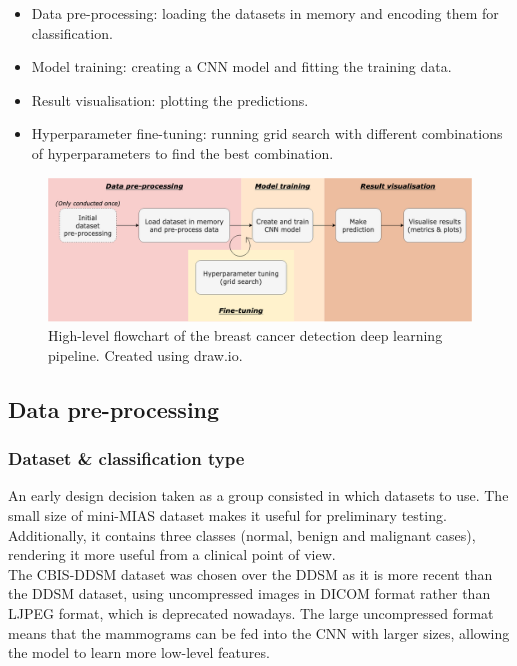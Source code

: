 \begin{itemize}
    \item Data pre-processing: loading the datasets in memory and encoding them for classification.
    \item Model training: creating a CNN model and fitting the training data.
    \item Result visualisation: plotting the predictions.
    \item Hyperparameter fine-tuning: running grid search with different combinations of hyperparameters to find the best combination.
\end{itemize}

\begin{figure}[ht]
\centerline{\includegraphics[width=1.1\textwidth]{Dissertation/figures/design/design flowchart.png}}
\caption{\label{fig:design-flowchart}High-level flowchart of the breast cancer detection deep learning pipeline. Created using draw.io.}
\end{figure}


\subsection{Data pre-processing}

\subsubsection{Dataset \& classification type}

An early design decision taken as a group consisted in which datasets to use. The small size of mini-MIAS dataset makes it useful for preliminary testing. Additionally, it contains three classes (normal, benign and malignant cases), rendering it more useful from a clinical point of view.\\  

The CBIS-DDSM dataset was chosen over the DDSM as it is more recent than the DDSM dataset, using uncompressed images in DICOM format rather than LJPEG format, which is deprecated nowadays. The large uncompressed format means that the mammograms can be fed into the CNN with larger sizes, allowing the model to learn more low-level features.

